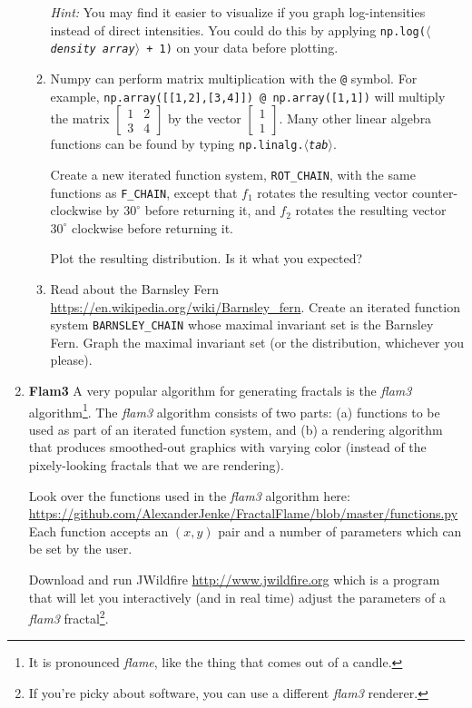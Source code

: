 \documentclass[letter]{article}
\newcommand{\mat}[1]{\begin{bmatrix}#1\end{bmatrix}}
\newcommand{\var}[1]{{$\langle$\it #1$\rangle$}}
\begin{document}
\begin{enumerate}
\begin{enumerate}
				\emph{Hint:} You may find it easier to visualize if you graph log-intensities instead of 
				direct intensities. You could do this by applying {\tt np.log(\var{density array} + 1)}
				on your data before plotting.

			\item Numpy can perform matrix multiplication with the {\tt @} symbol. For example,
				{\tt np.array([[1,2],[3,4]]) @ np.array([1,1])} will multiply the matrix
				$\mat{1&2\\3&4}$ by the vector $\mat{1\\1}$. Many other linear algebra functions
				can be found by typing {\tt np.linalg.\var{tab}}.

				Create a new iterated function system, \verb|ROT_CHAIN|, with the same functions as \verb|F_CHAIN|,
				except that $f_1$ rotates the resulting vector counter-clockwise by $30^\circ$ before returning it,
				and $f_2$ rotates the resulting vector $30^\circ$ clockwise before returning it.

				Plot the resulting distribution. Is it what you expected?

			\item Read about the Barnsley Fern \url{https://en.wikipedia.org/wiki/Barnsley_fern}. Create
				an iterated function system \verb|BARNSLEY_CHAIN| whose maximal invariant set is the Barnsley
				Fern. Graph the maximal invariant set (or the distribution, whichever you please).
				

				
		\end{enumerate}

	\item {\bfseries Flam3} A very popular algorithm for generating fractals is the \emph{flam3} algorithm\footnote{ It is pronounced
		\emph{flame}, like the thing that comes out of a candle.}. The \emph{flam3} algorithm consists of two parts:
		(a) functions to be used as part of an iterated function system, and (b) a rendering algorithm that produces
		smoothed-out graphics with varying color (instead of the pixely-looking fractals that we are rendering).

		Look over the functions used in the \emph{flam3} algorithm here: \url{https://github.com/AlexanderJenke/FractalFlame/blob/master/functions.py}
		Each function accepts an $(x,y)$ pair and a number of parameters which can be set by the user.

		Download and run JWildfire \url{http://www.jwildfire.org} which is a program that will let you interactively
		(and in real time) adjust the parameters of a \emph{flam3} fractal\footnote{ If you're picky about software, you can
		use a different \emph{flam3} renderer.}.


\end{enumerate}
\end{document}
